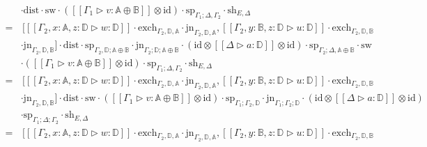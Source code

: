 \begin{equation*}
\begin{split}
      &  \cdot \text{dist} \cdot \text{sw} \cdot ([\![\Gamma_1 \triangleright v  : \mathbb{A} \oplus \mathbb{B}  ]\!] \otimes \text{id}) \cdot \text{sp}_{\Gamma_1; \Delta,\Gamma_2} \cdot \text{sh}_{E,\Delta} \\
      = & \hspace{2pt}  [[\![ \Gamma_2, x:\mathbb{A},z:\mathbb{D} \triangleright w: \mathbb{D}  ]\!] \cdot \text{exch}_{\Gamma_2, \mathbb{D},\mathbb{A}} \cdot \text{jn}_{\Gamma_2, \mathbb{D}, \mathbb{A}} ,   [\![ \Gamma_2, y:\mathbb{B},z:\mathbb{D} \triangleright u : \mathbb{D}  ]\!] \cdot \text{exch}_{\Gamma_2, \mathbb{D},\mathbb{B}}\\
      & \cdot\text{jn}_{\Gamma_2, \mathbb{D}, \mathbb{B}}]\cdot \text{dist} \cdot \text{sp}_{\Gamma_2, \mathbb{D}; \mathbb{A}\oplus \mathbb{B} } \cdot \text{jn}_{\Gamma_2; \mathbb{D}; \mathbb{A}\oplus \mathbb{B} } \cdot (\text{id} \otimes [\![ \Delta \triangleright a:\mathbb{D}  ]\!]  \otimes \text{id}) \cdot \text{sp}_{\Gamma_2;\Delta,\mathbb{A}\oplus \mathbb{B}}  \cdot \text{sw}  \\
      & \cdot ([\![\Gamma_1 \triangleright v  : \mathbb{A} \oplus \mathbb{B}  ]\!] \otimes \text{id}) \cdot \text{sp}_{\Gamma_1; \Delta,\Gamma_2} \cdot \text{sh}_{E,\Delta} \\
      = & \hspace{2pt} [[\![ \Gamma_2, x:\mathbb{A},z:\mathbb{D} \triangleright w: \mathbb{D}  ]\!] \cdot \text{exch}_{\Gamma_2, \mathbb{D},\mathbb{A}} \cdot \text{jn}_{\Gamma_2, \mathbb{D}, \mathbb{A}} ,   [\![ \Gamma_2, y:\mathbb{B},z:\mathbb{D} \triangleright u : \mathbb{D}  ]\!] \cdot \text{exch}_{\Gamma_2, \mathbb{D},\mathbb{B}}\\
      & \cdot\text{jn}_{\Gamma_2, \mathbb{D}, \mathbb{B}}]\cdot \text{dist} \cdot \text{sw} \cdot ([\![\Gamma_1 \triangleright v  : \mathbb{A} \oplus \mathbb{B}  ]\!] \otimes \text{id}) \cdot \text{sp}_{\Gamma_1;\Gamma_2, \mathbb{D}} \cdot  \text{jn}_{ \Gamma_1;\Gamma_2; \mathbb{D}} \cdot (\text{id} \otimes [\![ \Delta \triangleright a:\mathbb{D}  ]\!]  \otimes \text{id}) \\
      & \cdot \text{sp}_{\Gamma_1;\Delta;\Gamma_2} \cdot \text{sh}_{E,\Delta} \\
      = &  \hspace{2pt}  [[\![ \Gamma_2, x:\mathbb{A},z:\mathbb{D} \triangleright w: \mathbb{D}  ]\!] \cdot \text{exch}_{\Gamma_2, \mathbb{D},\mathbb{A}} \cdot \text{jn}_{\Gamma_2, \mathbb{D}, \mathbb{A}} ,   [\![ \Gamma_2, y:\mathbb{B},z:\mathbb{D} \triangleright u : \mathbb{D}  ]\!] \cdot \text{exch}_{\Gamma_2, \mathbb{D},\mathbb{B}}\\

\end{split}
\end{equation*}
